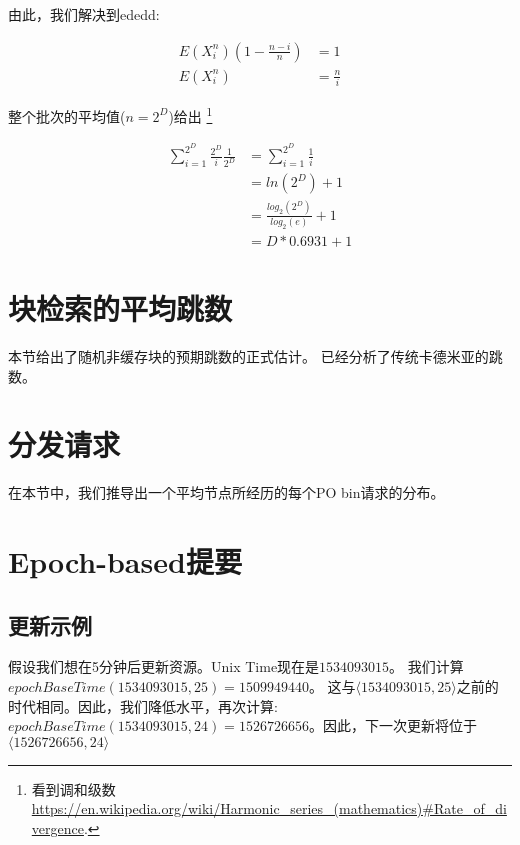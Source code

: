 由此，我们解决到ededd:

 \begin{subequations}   \begin{align}
\mathit{E}(X^n_i)(1-\frac{n-i}{n})&=1\\
\mathit{E}(X^n_i)&=\frac{n}{i}
\end{align} \end{subequations}

整个批次的平均值($n=2^D$)给出%
%
\footnote{看到调和级数 
\url{https://en.wikipedia.org/wiki/Harmonic\_series\_(mathematics)\#Rate\_of\_divergence}.}

 \begin{subequations}   \begin{align}
\sum_{i=1}^{2^D}\frac{2^D}{i}\frac{1}{2^D}
&=\sum_{i=1}^{2^D}\frac{1}{i}\\
&=\mathit{ln}(2^D)+1\\
&=\frac{\mathit{log}_2(2^D)}{\mathit{log}_2(e)}+1\\
&=D*0.6931+1
\end{align} \end{subequations}

\section{块检索的平均跳数}

本节给出了随机非缓存块的预期跳数的正式估计。  
\cite{roos2013comprehending, roos2015determining}已经分析了传统卡德米亚的跳数。

\section{分发请求}

在本节中，我们推导出一个平均节点所经历的每个PO bin请求的分布。

\section{Epoch-based提要\statusgreen}\label{sec:epoch-based-feeds-appendix}
\subsection*{更新示例\statusgreen}
 
假设我们想在5分钟后更新资源。Unix Time现在是$1534093015$。
我们计算$\mathit{epochBaseTime}(1534093015, 25) = 1509949440$。
这与$\langle  1534093015, 25\rangle$之前的时代相同。因此，我们降低水平，再次计算:
$\mathit{epochBaseTime}(1534093015, 24) = 1526726656$。因此，下一次更新将位于$\langle  1526726656, 24\rangle$

